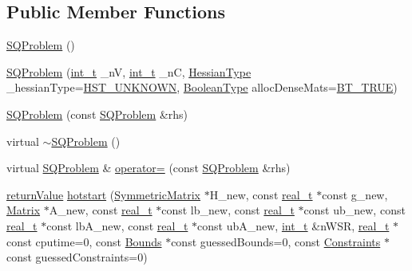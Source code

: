 \subsection*{Public Member Functions}
\begin{DoxyCompactItemize}
\item 
\hyperlink{class_s_q_problem_ae1cb6ec33ca0ea3021688d4ed2971b50}{S\+Q\+Problem} ()
\item 
\hyperlink{class_s_q_problem_a4504f82fbbb4d2f4d0891cb0fbfe2e85}{S\+Q\+Problem} (\hyperlink{_types_8hpp_ab6fd6105e64ed14a0c9281326f05e623}{int\+\_\+t} \+\_\+nV, \hyperlink{_types_8hpp_ab6fd6105e64ed14a0c9281326f05e623}{int\+\_\+t} \+\_\+nC, \hyperlink{_types_8hpp_a604cad5cda14e378ce4a77ab28ee9fd9}{Hessian\+Type} \+\_\+hessian\+Type=\hyperlink{_types_8hpp_a604cad5cda14e378ce4a77ab28ee9fd9a3479cf4e632ae731d4da9bf57a9f8907}{H\+S\+T\+\_\+\+U\+N\+K\+N\+O\+WN}, \hyperlink{_types_8hpp_a20f82124c82b6f5686a7fce454ef9089}{Boolean\+Type} alloc\+Dense\+Mats=\hyperlink{_types_8hpp_a20f82124c82b6f5686a7fce454ef9089a34c57965bfb07125b09326a69019f9c6}{B\+T\+\_\+\+T\+R\+UE})
\item 
\hyperlink{class_s_q_problem_a720cfa87922b63bdee6679a72c773c8d}{S\+Q\+Problem} (const \hyperlink{class_s_q_problem}{S\+Q\+Problem} \&rhs)
\item 
virtual \hyperlink{class_s_q_problem_a65cb28afd5651a23856c37f644155f31}{$\sim$\+S\+Q\+Problem} ()
\item 
virtual \hyperlink{class_s_q_problem}{S\+Q\+Problem} \& \hyperlink{class_s_q_problem_aa040a1957af3927e985b1cae3b1dff27}{operator=} (const \hyperlink{class_s_q_problem}{S\+Q\+Problem} \&rhs)
\item 
\hyperlink{_message_handling_8hpp_a81d556f613bfbabd0b1f9488c0fa865e}{return\+Value} \hyperlink{class_s_q_problem_ae68c5aac86779666981cf2b4e3fb7d64}{hotstart} (\hyperlink{class_symmetric_matrix}{Symmetric\+Matrix} $\ast$H\+\_\+new, const \hyperlink{qp_o_a_s_e_s__wrapper_8h_a0d00e2b3dfadee81331bbb39068570c4}{real\+\_\+t} $\ast$const g\+\_\+new, \hyperlink{class_matrix}{Matrix} $\ast$A\+\_\+new, const \hyperlink{qp_o_a_s_e_s__wrapper_8h_a0d00e2b3dfadee81331bbb39068570c4}{real\+\_\+t} $\ast$const lb\+\_\+new, const \hyperlink{qp_o_a_s_e_s__wrapper_8h_a0d00e2b3dfadee81331bbb39068570c4}{real\+\_\+t} $\ast$const ub\+\_\+new, const \hyperlink{qp_o_a_s_e_s__wrapper_8h_a0d00e2b3dfadee81331bbb39068570c4}{real\+\_\+t} $\ast$const lb\+A\+\_\+new, const \hyperlink{qp_o_a_s_e_s__wrapper_8h_a0d00e2b3dfadee81331bbb39068570c4}{real\+\_\+t} $\ast$const ub\+A\+\_\+new, \hyperlink{_types_8hpp_ab6fd6105e64ed14a0c9281326f05e623}{int\+\_\+t} \&n\+W\+SR, \hyperlink{qp_o_a_s_e_s__wrapper_8h_a0d00e2b3dfadee81331bbb39068570c4}{real\+\_\+t} $\ast$const cputime=0, const \hyperlink{class_bounds}{Bounds} $\ast$const guessed\+Bounds=0, const \hyperlink{class_constraints}{Constraints} $\ast$const guessed\+Constraints=0)

\end{DoxyCompactItemize}

